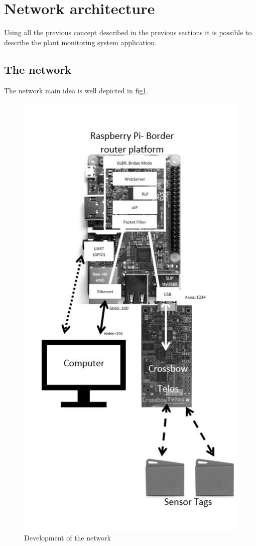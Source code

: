 \section{Network architecture}
Using all the previous concept described in the previous sections it is possible to describe the plant monitoring system application.
\subsection{The network}
The network main idea is well depicted in fig\ref{fig:Network}.

\begin{figure}[!h]
	\includegraphics[width=\linewidth]{Network}
	\caption{Development of the network}
	\label{fig:Network}
\end{figure}


